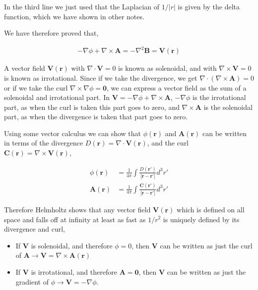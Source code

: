 \documentclass[11pt]{amsart}
\begin{document}
In the third line we just used that the Laplacian of $1/|r|$ is given by the delta function, which we have shown in other notes.

We have therefore proved that,

\begin{align*}
  -\nabla\phi+\nabla\times\mathbf{A}=-\nabla^2\mathbf{B}=\mathbf{V}(\mathbf{r})
\end{align*}

A vector field $\mathbf{V}(\mathbf{r})$ with $\nabla\cdot\mathbf{V}=0$ is known as solenoidal, and with $\nabla\times\mathbf{V}=0$ is known as irrotational. Since if we take the divergence, we get $\nabla\cdot(\nabla\times\mathbf{A})=0$ or if we take the curl $\nabla\times\nabla\phi=\mathbf{0}$, we can express a vector field as the sum of a solenoidal and irrotational part. In $\mathbf{V}=-\nabla\phi+\nabla\times\mathbf{A}$, $-\nabla\phi$ is the irrotational part, as when the curl is taken this part goes to zero, and $\nabla\times\mathbf{A}$ is the solenoidal part, as when the divergence is taken that part goes to zero.

Using some vector calculus we can show that $\phi(\mathbf{r})$ and $\mathbf{A}(\mathbf{r})$ can be written in terms of the divergence $D(\mathbf{r})=\nabla\cdot\mathbf{V}(\mathbf{r})$, and the curl $\mathbf{C}(\mathbf{r})=\nabla\times\mathbf{V}(\mathbf{r})$,

\begin{align*}
  \phi(\mathbf{r})&=\frac{1}{4\pi}\int\frac{D(\mathbf{r'})}{|\mathbf{r}-\mathbf{r'}|}d^3r' \\
  \mathbf{A}(\mathbf{r})&=\frac{1}{4\pi}\int\frac{\mathbf{C}(\mathbf{r'})}{|\mathbf{r}-\mathbf{r'}|}d^3r'
\end{align*}

Therefore Helmholtz shows that any vector field $\mathbf{V}(\mathbf{r})$ which is defined on all space and falls off at infinity at least as fast as $1/r^2$ is uniquely defined by its divergence and curl,

\begin{itemize}
  \item If $\mathbf{V}$ is solenoidal, and therefore $\phi=0$, then $\mathbf{V}$ can be written as just the curl of $\mathbf{A} \to \mathbf{V}=\nabla\times\mathbf{A}(\mathbf{r})$
  \item If $\mathbf{V}$ is irrotational, and therefore $\mathbf{A}=\mathbf{0}$, then $\mathbf{V}$ can be written as just the gradient of $\phi \to \mathbf{V}=-\nabla\phi$.
\end{itemize}
\end{document}
